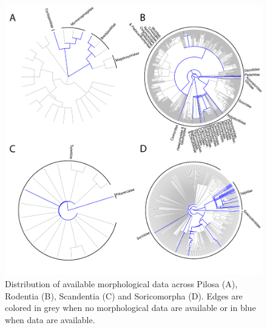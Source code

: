 \begin{figure}[!ht]
\centering
    \includegraphics[width=\textwidth]{Supplementaries/Figures/MissingMammals/Combined_phy3.pdf}
\caption[Available data in Pilosa, Rodentia, Scandentia and Soricomorpha]{Distribution of available morphological data across Pilosa (A), Rodentia (B), Scandentia (C) and Soricomorpha (D). Edges are colored in grey when no morphological data are available or in blue when data are available.}
\label{Supp_combined_phy3}
\end{figure}
